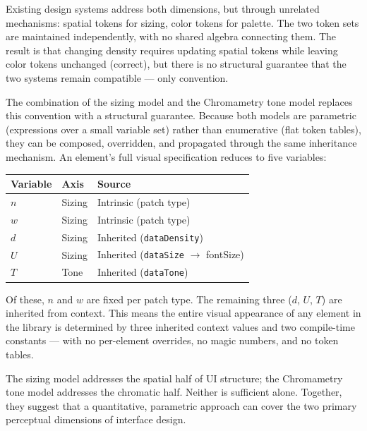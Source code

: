 Existing design systems address both dimensions, but through unrelated mechanisms: spatial tokens for sizing, color tokens for palette. The two token sets are maintained independently, with no shared algebra connecting them. The result is that changing density requires updating spatial tokens while leaving color tokens unchanged (correct), but there is no structural guarantee that the two systems remain compatible --- only convention.

The combination of the sizing model and the Chromametry tone model replaces this convention with a structural guarantee. Because both models are parametric (expressions over a small variable set) rather than enumerative (flat token tables), they can be composed, overridden, and propagated through the same inheritance mechanism. An element's full visual specification reduces to five variables:

\begin{center}
\begin{tabular}{lll}
\toprule
Variable & Axis & Source \\
\midrule
$n$ & Sizing & Intrinsic (patch type) \\
$w$ & Sizing & Intrinsic (patch type) \\
$d$ & Sizing & Inherited (\texttt{dataDensity}) \\
$U$ & Sizing & Inherited (\texttt{dataSize} $\to$ fontSize) \\
$T$ & Tone & Inherited (\texttt{dataTone}) \\
\bottomrule
\end{tabular}
\end{center}

Of these, $n$ and $w$ are fixed per patch type. The remaining three ($d$, $U$, $T$) are inherited from context. This means the entire visual appearance of any element in the library is determined by three inherited context values and two compile-time constants --- with no per-element overrides, no magic numbers, and no token tables.

The sizing model addresses the spatial half of UI structure; the Chromametry tone model addresses the chromatic half. Neither is sufficient alone. Together, they suggest that a quantitative, parametric approach can cover the two primary perceptual dimensions of interface design.
